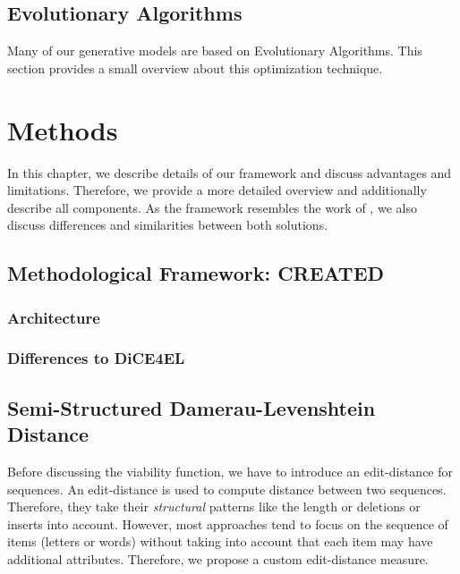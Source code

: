 \documentclass[runningheads]{llncs}
\begin{document}
\subsection{Evolutionary Algorithms}
\label{sec:evo}
Many of our generative models are based on Evolutionary Algorithms. This section provides a small overview about this optimization technique.  


\section{Methods}
\label{ch:methods}
In this chapter, we describe details of our framework and discuss advantages and limitations. 
Therefore, we provide a more detailed overview and additionally describe all components. As the framework resembles the work of \citeauthor{hsieh_DiCE4ELInterpretingProcess_2021}\cite{hsieh_DiCE4ELInterpretingProcess}, we also discuss differences and similarities between both solutions. 

\subsection{Methodological Framework: CREATED}
\label{sec:framework}
\subsubsection{Architecture}


\subsubsection{Differences to DiCE4EL}


\subsection{Semi-Structured Damerau-Levenshtein \\ Distance}
\label{sec:ssdld}
Before discussing the viability function, we have to introduce an edit-distance for sequences. An edit-distance is used to compute distance between two sequences. Therefore, they take their \emph{structural} patterns like the length or deletions or inserts into account. However, most approaches tend to focus on the sequence of items (letters or words) without taking into account that each item may have additional attributes. Therefore, we propose a custom edit-distance measure. 
\end{document}
